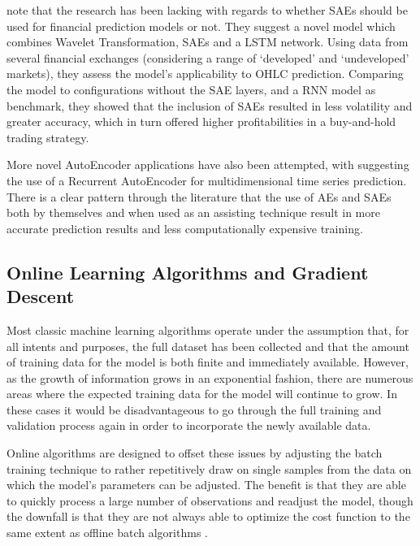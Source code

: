 \documentclass[a4paper,11pt,oneside]{article}
\theoremstyle{plain}
\theoremstyle{definition}
\begin{document}
	\citet{Bao} note that the research has been lacking with regards to whether SAEs should be used for 
	financial prediction models or not. They suggest a novel model which combines Wavelet Transformation, SAEs 
	and a LSTM network. Using data from several financial exchanges (considering a 
	range of ‘developed’ and ‘undeveloped’ markets), they assess the model’s applicability to OHLC prediction. 
	Comparing the model to configurations without the SAE layers, and a RNN model as benchmark, they showed 
	that the inclusion of SAEs resulted in less volatility and greater accuracy, which in turn offered higher profitabilities 
	in a buy-and-hold trading strategy.
	\hfill \break 
	
	More novel AutoEncoder applications have also been attempted, with \citet{Hsu} suggesting the use of a 
	Recurrent AutoEncoder for multidimensional time series prediction. There is a clear pattern through the literature 
	that the use of AEs and SAEs both by themselves and when used as an assisting technique result in more accurate 
	prediction results and less computationally expensive training.
	
	\subsection{Online Learning Algorithms and Gradient Descent} \label{lr_OGD}
	\hfill
	
	Most classic machine learning algorithms operate under the assumption that, for all intents and purposes, the 
	full dataset has been collected and that the amount of training data for the model is both finite and immediately 
	available. However, as the growth of information grows in an exponential fashion, there are numerous areas where
	the expected training data for the model will continue to grow. In these cases it would be disadvantageous to go 
	through the full training and validation process again in order to incorporate the newly available data.
	\hfill\break
	
	Online algorithms are designed to offset these issues by adjusting the batch training technique to rather 
	repetitively draw on single samples from the data on which the model’s parameters can be adjusted. The benefit 
	is that they are able to quickly process a large number of observations and readjust the model, though the 
	downfall is that they are not always able to optimize the cost function to the same extent as offline batch 
	algorithms \citep{Albers}.
	\hfill\break
	
\end{document}
